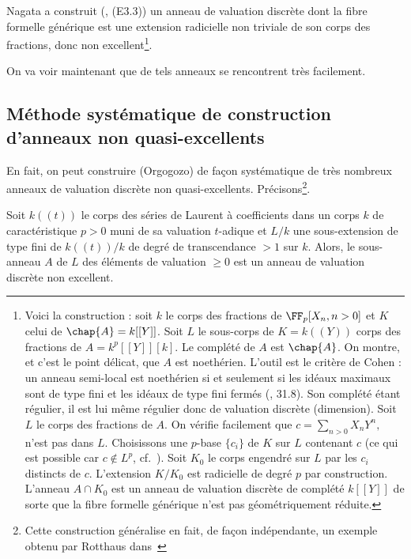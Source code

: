 \documentclass[10pt]{../fichiers-configuration-latex/smfart}
\begin{document}
\begin{remarque}\label{1DVR-bad}Nagata a construit (\cite{Nag62}, (E3.3)) un anneau de valuation
discrète dont la fibre formelle générique est une extension radicielle non triviale de son  corps
des fractions, donc non excellent\footnote{\label{1note-DVR-bad}Voici la construction : soit $k$ le
corps des fractions de $\FF_p[X_n,n> 0]$ et $K$ celui de $\chap{A}=k[[Y]]$. Soit $L$ le sous-corps
de $K=k((Y))$ corps des fractions de $A=k^p[[Y]][k]$. Le complété de $A$ est $\chap{A}$. On montre,
et c'est le point délicat, que $A$ est noethérien. L'outil est le critère de Cohen : un anneau
semi-local est noethérien si et seulement si les idéaux maximaux sont de type fini et les idéaux de
type fini fermés (\cite{Nag62}, 31.8). Son complété étant régulier, il est lui même régulier donc de
valuation discrète (dimension).  Soit $L$ le corps des fractions de $A$. On vérifie facilement que
$c=\sum_{n> 0}X_nY^n,$ n'est pas dans $L$. Choisissons une $p$-base $\{c_i\}$ de $K$ sur $L$
contenant $c$ (ce qui est possible car $c\not\in L^p$, cf.~). Soit $K_0$ le
corps engendré sur $L$ par les $c_i$ distincts de $c$. L'extension $K/K_0$ est radicielle de degré
$p$ par construction. L'anneau $A\cap K_0$ est un anneau de valuation discrète de complété $k[[Y]]$
de sorte que la fibre formelle générique n'est pas géométriquement réduite.}.  \end{remarque}

 On va voir maintenant que de tels anneaux se rencontrent très facilement.



\subsection{Méthode systématique de construction d'anneaux non quasi-excellents}\label{1patho-DVR}
En fait, on peut construire (Orgogozo) de façon systématique de très nombreux anneaux de valuation
discrète non quasi-excellents. Précisons\footnote{Cette construction généralise en fait, de façon
indépendante, un exemple obtenu par Rotthaus dans~\cite{Rot97}}.


\begin{proposition}\label{1lot-bad-DVR}Soit $k((t))$ le corps des séries de Laurent à coefficients
dans un corps $k$ de caractéristique $p>0$ muni de sa valuation $t$-adique et $L/k$ une
sous-extension de type fini de $k((t))/k$ de degré de transcendance $>1$ sur $k$. Alors, le
sous-anneau $A$ de $L$ des éléments de valuation $\geq 0$ est un anneau de valuation discrète non
excellent.  \end{proposition}
\end{document}
